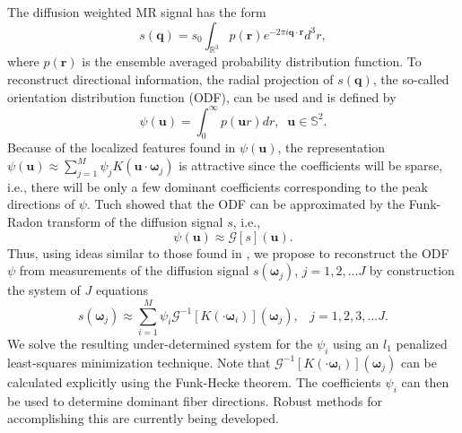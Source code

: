 \documentclass[landscape,a0b,final]{a0poster}
\newcommand{\bomega}{{\boldsymbol{\omega}}}
\newenvironment{poster}{
  \begin{center}
  \begin{minipage}[c]{0.98\textwidth}
}{
  \end{minipage} 
  \end{center}
}
\newcommand{\pbox}[4]{
\psshadowbox[#3]{
\begin{minipage}[t][#2][t]{#1}
#4
\end{minipage}
}}
\begin{document}
\begin{poster}
\begin{multicols}{3}
%
\begin{center}\pbox{0.8\columnwidth}{}{linewidth=2mm,framearc=0.1,linecolor=lightblue,fillstyle=gradient,gradangle=0,gradbegin=white,gradend=whiteblue,gradmidpoint=1.0,framesep=1em}{\begin{center}HARDI Reconstruction\end{center}}\end{center}
The diffusion weighted MR signal has the form
%
\begin{equation}
  s\left(\mathbf{q}\right) = s_0\int_{\mathbb{R}^3}p\left(\mathbf{r}\right)e^{-2\pi i \mathbf{q}\cdot\mathbf{r}}d^3r,
\end{equation}
%
where $p\left(\mathbf{r}\right)$ is the ensemble averaged probability distribution function. To reconstruct directional information, the radial projection of $s\left(\mathbf{q}\right)$, the so-called orientation distribution function (ODF), can be used and is defined by
%
\begin{equation}
  \psi\left(\mathbf{u}\right) = \int_0^{\infty} p\left(\mathbf{u}r\right) dr,\;\; \mathbf{u}\in\mathbb{S}^2.
\end{equation}
Because of the localized features found in $\psi\left(\mathbf{u}\right)$, the representation $\psi\left(\mathbf{u}\right) \approx \sum_{j=1}^M \psi_j K\left(\mathbf{u}\cdot\bomega_{j}\right)$ is attractive since the coefficients will be sparse, i.e., there will be only a few dominant coefficients corresponding to the peak directions of $\psi$. Tuch \cite{TUCH-2004} showed that the ODF can be approximated by the Funk-Radon transform of the diffusion signal $s$, i.e.,
%
\begin{equation}
  \psi\left(\mathbf{u}\right) \approx \mathcal{G}\left[s\right]\left(\mathbf{u}\right).
\end{equation}
%
Thus, using ideas similar to those found in \cite{L-C-D-H-2009}, we propose to reconstruct the ODF $\psi$ from measurements of the diffusion signal $s\left(\bomega_{j}\right)$, $j=1,2,...J$ by construction the system of $J$ equations
%
\begin{equation}
  s\left(\bomega_{j}\right) \approx \sum_{i=1}^M \psi_i \mathcal{G}^{-1}\left[K\left(\cdot\bomega_{i}\right)\right]\left(\bomega_{j}\right), \;\;\;j=1,2,3,...J.
\end{equation}
%
We solve the resulting under-determined system for the $\psi_i$ using an $l_1$ penalized least-squares minimization technique. Note that $\mathcal{G}^{-1}\left[K\left(\cdot\bomega_{i}\right)\right]\left(\bomega_{j}\right)$ can be calculated explicitly using the Funk-Hecke theorem. The coefficients $\psi_i$ can then be used to determine dominant fiber directions. Robust methods for accomplishing this are currently being developed.

\end{multicols}
\end{poster}
\end{document}
